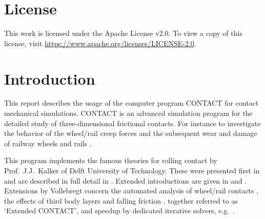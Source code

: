 \documentclass[12pt]{report}
\begin{document}

\tableofcontents

\clearpage
\chapter*{License}

This work is licensed under the Apache License v2.0. To view a copy of this
license, visit
\href{https://www.apache.org/licenses/LICENSE-2.0}{https://\-www.apache.org/licenses/LICENSE-2.0}.


\clearpage


\chapter{Introduction}
\label{chp:introduction}

This report describes the usage of the computer program CONTACT for contact
mechanical simulations. CONTACT is an advanced simulation program for the
detailed study of three-dimensional frictional contacts. For instance to
investigate the behavior of the wheel/rail creep forces and the subsequent
wear and damage of railway wheels and rails \cite{Meymand2016a-review,
Vollebregt2021a-soa-paper}.

This program implements the famous theories for rolling contact by Prof.\
J.J.\ Kalker of Delft University of Technology. These were presented first
in \cite{Kalker1979a} and are described in full detail in
\cite{Kalker1990}. Extended introductions are given in \cite{Kalker2000}
and \cite{Vollebregt2011a-assessm}. Extensions by Vollebregt concern the
automated analysis of wheel/rail contacts \cite{Vollebregt2020b-wrgeom,
Vollebregt2020c-distr-force,Vollebregt2022b-cm2022,
Vollebregt2023a-iavsd2023}, the effects of third
body layers \cite{Vollebregt2014c-tractcurv,Vollebregt2019a-fra} and
falling friction \cite{Vollebregt2012a-quasistd}, together referred to as
`Extended CONTACT', and speedup by dedicated iterative solvers, e.g.\
\cite{Vollebregt2014a-fftprec,Zhao_Jing2015a-tangcg}.
\end{document}
